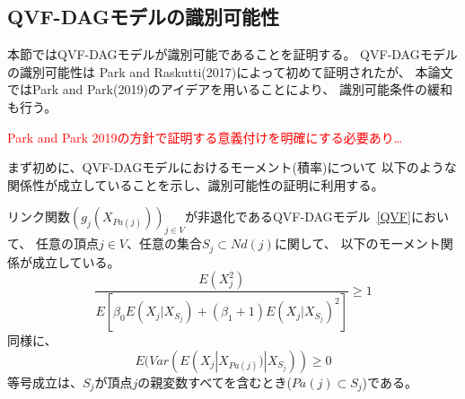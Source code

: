 
\subsection{QVF-DAGモデルの識別可能性}

本節ではQVF-DAGモデルが識別可能であることを証明する。
QVF-DAGモデルの識別可能性は
Park and Raskutti(2017)\cite{Park2017-hw}によって初めて証明されたが、
本論文ではPark and Park(2019)\cite{Park2019-qy}のアイデアを用いることにより、
識別可能条件の緩和も行う。

\textcolor{red}{Park and Park 2019の方針で証明する意義付けを明確にする必要あり…}

まず初めに、QVF-DAGモデルにおけるモーメント(積率)について
以下のような関係性が成立していることを示し、識別可能性の証明に利用する。

\begin{prop} \label{prop:MRS}
  リンク関数$(g_j(X_{Pa(j)}))_{j \in V}$が非退化であるQVF-DAGモデル~\eqref{QVF}において、
  任意の頂点$j \in V$、任意の集合$S_j \subset \mathit{Nd}(j)$に関して、
  以下のモーメント関係が成立している。
  \begin{equation}
    \frac{E(X_j^2)}
    {E \left[ \beta_0 E(X_j | X_{S_j}) + (\beta_1 + 1)E(X_j | X_{S_j})^2 \right]}
    \geq 1
    \label{eq:MRS}
  \end{equation}
  同様に、
  \begin{equation}
    E(\mathit{Var}( E(X_j | X_{Pa(j)}) | X_{S_j} )) \geq 0
  \end{equation}
  等号成立は、$S_j$が頂点$j$の親変数すべてを含むとき($Pa(j)\subset S_j$)である。
\end{prop}

